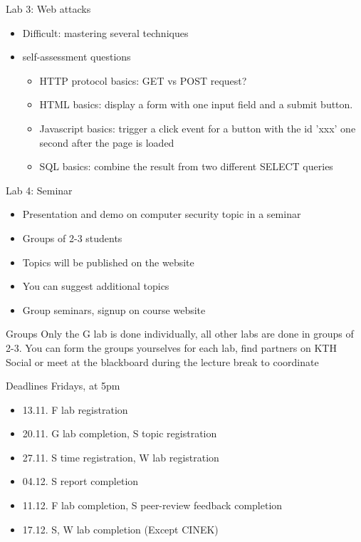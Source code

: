 \documentclass{beamer}
\begin{document}
\begin{frame}{Lab 3: Web attacks}
  \begin{itemize}
  \item Difficult: mastering several techniques
  \item self-assessment questions
    \begin{itemize}
      \item HTTP protocol basics: GET vs POST request?
      \item HTML basics: display a form with one input field and a
        submit button.
      \item Javascript basics: trigger a click event for a button with
        the id 'xxx' one second after the page is loaded
      \item SQL basics: combine the result from two different SELECT queries
    \end{itemize}
  \end{itemize}
\end{frame}

\begin{frame}{Lab 4: Seminar}
  \begin{itemize}
    \item Presentation and demo on computer security 
      topic in a seminar
    \item Groups of 2-3 students
    \item Topics will be published on the website
    \item You can suggest additional topics
    \item Group seminars, signup on course website
  \end{itemize}
\end{frame}

\begin{frame}{Groups}
 Only the G lab is done individually, all other labs
are done in groups of 2-3. You can form the
groups yourselves for each lab, find partners on
KTH Social or meet at the blackboard during the
lecture break to coordinate
\end{frame}

\begin{frame}{Deadlines}
  Fridays, at 5pm
  \begin{itemize}
    \item 13.11. F lab registration
    \item 20.11. G lab completion, S topic registration
    \item 27.11. S time registration, W lab registration
    \item 04.12. S report completion
    \item 11.12. F lab completion, S peer-review feedback completion
    \item 17.12. S, W lab completion (Except CINEK)
  \end{itemize}
\end{frame}
\end{document}
